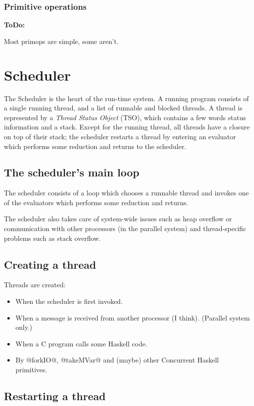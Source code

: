 \documentclass[11pt]{article}
\newcommand{\ToDo}[1]{{{\bf ToDo:}\sl #1}}
\newcommand{\Section}[2]{\section{#1}\label{sec:#2}}
\newcommand{\Subsection}[2]{\subsection{#1}\label{sec:#2}}
\newcommand{\Subsubsection}[2]{\subsubsection{#1}\label{sec:#2}}
\begin{document}
\Subsubsection{Primitive operations}{primop-overview}

\ToDo{}

Most primops are simple, some aren't.






\Section{Scheduler}{scheduler-overview}

The Scheduler is the heart of the run-time system.  A running program
consists of a single running thread, and a list of runnable and
blocked threads.  A thread is represented by a \emph{Thread Status
Object} (TSO), which contains a few words status information and a
stack.  Except for the running thread, all threads have a closure on
top of their stack; the scheduler restarts a thread by entering an
evaluator which performs some reduction and returns to the scheduler.

\Subsection{The scheduler's main loop}{scheduler-main-loop}

The scheduler consists of a loop which chooses a runnable thread and
invokes one of the evaluators which performs some reduction and
returns.

The scheduler also takes care of system-wide issues such as heap
overflow or communication with other processors (in the parallel
system) and thread-specific problems such as stack overflow.

\Subsection{Creating a thread}{create-thread}

Threads are created:

\begin{itemize}

\item

When the scheduler is first invoked.

\item

When a message is received from another processor (I think). (Parallel
system only.)

\item

When a C program calls some Haskell code.

\item

By @forkIO@, @takeMVar@ and (maybe) other Concurrent Haskell primitives.

\end{itemize}


\Subsection{Restarting a thread}{thread-restart}
\end{document}
